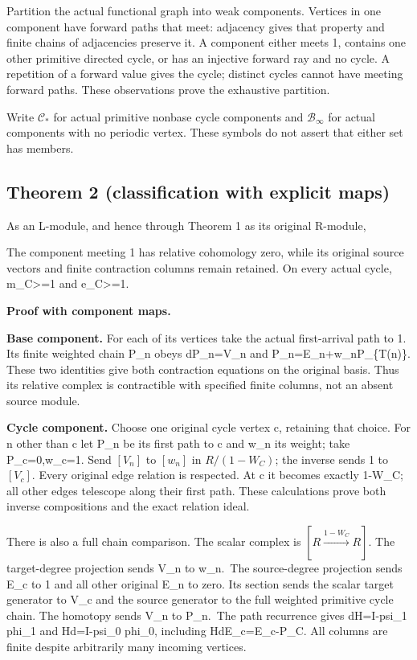 Partition the actual functional graph into weak components. Vertices in
one component have forward paths that meet: adjacency gives that
property and finite chains of adjacencies preserve it. A component
either meets 1, contains one other primitive directed cycle, or has an
injective forward ray and no cycle. A repetition of a forward value
gives the cycle; distinct cycles cannot have meeting forward paths.
These observations prove the exhaustive partition.

Write \(\mathcal C_*\) for actual primitive nonbase cycle components and
\(\mathcal B_\infty\) for actual components with no periodic vertex.
These symbols do not assert that either set has members.

\subsection{Theorem 2 (classification with explicit maps)}

As an L-module, and hence through Theorem 1 as its original R-module,


The component meeting 1 has relative cohomology zero, while its original
source vectors and finite contraction columns remain retained. On every
actual cycle, m\_C\textgreater=1 and e\_C\textgreater=1.

\textbf{Proof with component maps.}

\textbf{Base component.} For each of its vertices take the actual
first-arrival path to 1. Its finite weighted chain P\_n obeys dP\_n=V\_n
and P\_n=E\_n+w\_nP\_\{T(n)\}. These two identities give both
contraction equations on the original basis. Thus its relative complex
is contractible with specified finite columns, not an absent source
module.

\textbf{Cycle component.} Choose one original cycle vertex c, retaining
that choice. For n other than c let P\_n be its first path to c and w\_n
its weight; take P\_c=0,w\_c=1. Send \([V_n]\) to \([w_n]\) in
\(R/(1-W_C)\); the inverse sends 1 to \([V_c]\). Every original edge
relation is respected. At c it becomes exactly 1-W\_C; all other edges
telescope along their first path. These calculations prove both inverse
compositions and the exact relation ideal.

There is also a full chain comparison. The scalar complex is
\([R\xrightarrow{1-W_C}R]\). The target-degree projection sends V\_n to
w\_n.~The source-degree projection sends E\_c to 1 and all other
original E\_n to zero. Its section sends the scalar target generator to
V\_c and the source generator to the full weighted primitive cycle
chain. The homotopy sends V\_n to P\_n.~The path recurrence gives
dH=I-psi\_1 phi\_1 and Hd=I-psi\_0 phi\_0, including HdE\_c=E\_c-P\_C.
All columns are finite despite arbitrarily many incoming vertices.

